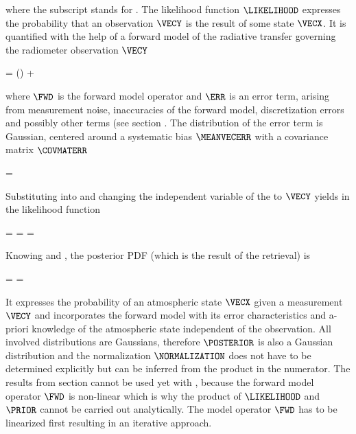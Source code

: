     where the subscript  stands for . The likelihood
    function $\LIKELIHOOD$ expresses the probability that an observation
    $\VECY$ is the result of some state $\VECX$. It is quantified with the help
    of a forward model of the radiative transfer governing the radiometer
    observation $\VECY$

    \startformula
        \VECY = \FWD(\VECX) + \ERR \EQCOMMA
    \stopformula

    where $\FWD$ is the forward model operator and $\ERR$ is an error term,
    arising from measurement noise, inaccuracies of the forward model,
    discretization errors and possibly other terms (see section
    . The distribution of the error term is Gaussian,
    centered around a systematic bias $\MEANVECERR$ with a covariance matrix
    $\COVMATERR$

    \startformula
        \PROB{\ERR} = \GAUSS{\ERR}{\MEANVECERR}{\COVMATERR} \EQSTOP
    \stopformula

    Substituting  into  and
    changing the independent variable of the {\PDF} to $\VECY$ yields in the
    likelihood function
    
    \placesubformula
    \startformula
    \startalign[n=3,align={right,middle,left}]
        \NC \PROB{\VECY - \FWD(\VECX)} = \NC
            \GAUSS{\VECY - \FWD(\VECX)}{\MEANVECERR}{\COVMATERR} \NC \NR
        \NC = \NC \GAUSS{\VECY}{\FWD(\VECX)+\MEANVECERR}{\COVMATERR} \NC
            = \LIKELIHOOD \EQSTOP {}
    \stopalign
    \stopformula

    Knowing  and , the
    posterior PDF (which is the result of the retrieval) is

    \startformula
        \POSTERIOR
        = \frac{\LIKELIHOOD \PRIOR}{\NORMALIZATION}
        = \frac{\GAUSS{\VECY}{\FWD(\VECX) + \MEANVECERR}{\COVMATERR}
            ~\GAUSS{\VECX}{\MEANVECA}{\COVMATA}}{\NORMALIZATION} \EQSTOP
    \stopformula

    It expresses the probability of an atmospheric state $\VECX$ given a
    measurement $\VECY$ and incorporates the forward model with its error
    characteristics and a-priori knowledge of the atmospheric state independent
    of the observation. All involved distributions are Gaussians, therefore
    $\POSTERIOR$ is also a Gaussian distribution and the normalization
    $\NORMALIZATION$ does not have to be determined explicitly
    but can be inferred from the product in the numerator.
    The results from section  cannot be used yet with
    , because the forward model operator $\FWD$ is
    non-linear which is why the product of $\LIKELIHOOD$ and $\PRIOR$ cannot
    be carried out analytically. 
    The model operator $\FWD$ has to be linearized first resulting in an
    iterative approach.

